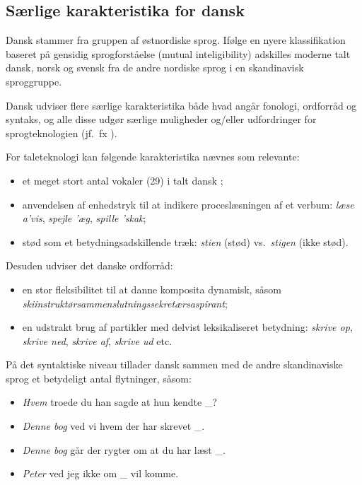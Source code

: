 \begin{multicols}{2}
\subsection{S\ae rlige karakteristika for dansk}

 Dansk stammer fra gruppen af \o stnordiske sprog. If\o lge en nyere klassifikation baseret \mbox{p\aa} gensidig sprogforst\aa else (mutual inteligibility) adskilles moderne talt dansk, norsk og svensk fra de andre nordiske sprog i en skandinavisk sproggruppe. 
 
Dansk udviser flere s\ae rlige karakteristika b\aa de hvad ang\aa r fonologi, ordforr\aa d og syntaks, og alle disse udg\o r s\ae rlige muligheder og/eller udfordringer for sprogteknologien (jf.\ fx \cite{Gregersen, Hellan, Braasch}).


For taleteknologi kan f\o lgende karakteristika n\ae vnes som relevante:
\begin{itemize}
\item 	et meget stort antal vokaler (29) i talt dansk \cite{dansk};
\item 	anvendelsen af enhedstryk til at indikere procesl\ae sningen af et verbum: {\it l\ae se a'vis}, {\it spejle '\ae g}, {\it spille 'skak};
\item 	st\o d som et betydningsadskillende tr\ae k: {\it stien} (st\o d) vs.\ {\it stigen} (ikke st\o d).
\end{itemize}
Desuden udviser det danske ordforr\aa d:
\begin{itemize}
\item 	en stor fleksibilitet til at danne komposita dynamisk, s\aa som {\it skiinstrukt\o rsammenslut\-nings\-sekret\ae rs\-as\-pirant};
\item 	en udstrakt brug af partikler med delvist leksikaliseret betydning: {\it skrive op}, {\it skrive ned}, {\it skrive af}, {\it skrive ud} etc.
\end{itemize}
\mbox{P\aa} det syntaktiske niveau tillader dansk sammen med de andre skandinaviske sprog et betydeligt antal flytninger, s\aa som:
\begin{itemize}
\item {\it Hvem} troede du han sagde at hun kendte \_?
\item {\it Denne bog} ved vi hvem der har skrevet \_.
\item {\it Denne bog} g\aa r der rygter om at du har l\ae st \_. 
\item {\it Peter} ved jeg ikke om \_ vil komme.
\end{itemize}


\end{multicols}

